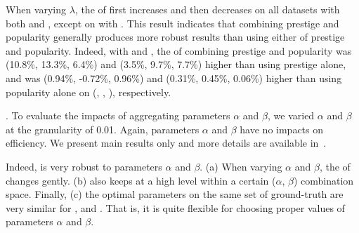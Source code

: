 When varying $\lambda$, the \PairAcc of \ensemblerank first increases and then decreases on all datasets with both \fcita and \recom, except on \aminer with \recom. This result indicates that combining prestige and popularity generally produces more robust results than using either of prestige and popularity.
Indeed, with \recom and \fcita, the \PairAcc of combining prestige and popularity was (10.8\%, 13.3\%, 6.4\%) and (3.5\%, 9.7\%, 7.7\%) higher than using prestige alone, and was (0.94\%, -0.72\%, 0.96\%) and (0.31\%, 0.45\%, 0.06\%) higher than using popularity alone on (\aan, \aminer, \magdata), respectively.




.
To evaluate the impacts of aggregating parameters $\alpha$ and $\beta$, we varied $\alpha$ and $\beta$ at the granularity of 0.01.
Again, parameters $\alpha$ and $\beta$ have no impacts on efficiency. We present main results only and more details are available in~\cite{SARank-full}.


Indeed, \ensemblerank is very robust to parameters $\alpha$ and $\beta$.
(a) When varying $\alpha$ and $\beta$, the \PairAcc of \ensemblerank changes gently. (b) \PairAcc also keeps at a high level within a certain ($\alpha$, $\beta$)  combination space. Finally, (c) the optimal parameters on the same set of ground-truth are very similar for \aan, \aminer and \magdata. That is, it is quite flexible for choosing proper values
of  parameters $\alpha$ and $\beta$.

